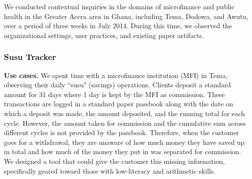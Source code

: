 \documentclass{sig-alternate}
\begin{document}
We conducted contextual inquiries in the domains of microfinance and public health in the Greater Accra area in Ghana, including Tema, Dodowa, and Awutu, over a period of three weeks in July 2014. During this time, we observed the organizational settings, user practices, and existing paper artifacts. 

\subsubsection{Susu Tracker}
\label{sec:susu}
\textbf{Use cases.}
We spent time with a microfinance institution (MFI) in Tema, observing their daily ``susu" (savings) operations. Clients deposit a standard amount for 31 days where 1 day is kept by the MFI as commission. These transactions are logged in a standard paper passbook along with the date on which a deposit was made, the amount deposited, and the running total for each cycle. However, the amount taken for commission and the cumulative sum across different cycles is not provided by the passbook. Therefore, when the customer goes for a withdrawal, they are unaware of how much money they have saved up in total and how much of the money they put in was separated for commission. We designed a tool that could give the customer this missing information, specifically geared toward those with low-literacy and arithmetic skills.


\end{document}
